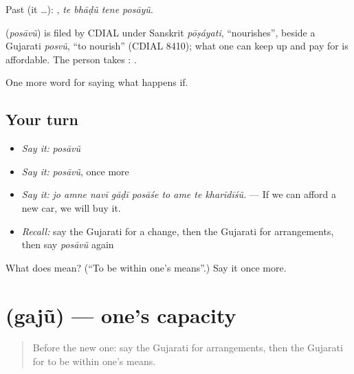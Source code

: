 Past (it …):    , \emph{te bhāḍũ tene posāyũ}.

\begin{cousinweb}
\textbf{} (\emph{posāvũ}) is filed by CDIAL under Sanskrit \emph{pōṣáyati}, \textquotedblleft{}nourishes\textquotedblright{}, beside a Gujarati \emph{posvũ}, \textquotedblleft{}to nourish\textquotedblright{} (CDIAL 8410); what one can keep up and pay for is affordable. The person takes \textbf{}: \textbf{  }.
\end{cousinweb}

\begin{grammarlens}[title={What you've built}]
One more word for saying what happens if.
\end{grammarlens}

\subsection*{Your turn}
\begin{itemize}
\raggedright
  \item \emph{Say it:} \emph{posāvũ}
  \item \emph{Say it:} \emph{posāvũ}, once more
  \item \emph{Say it:} \emph{jo amne navī gāḍī posāśe to ame te kharīdīśũ.} — If we can afford a new car, we will buy it.
  \item \emph{Recall:} say the Gujarati for a change, then the Gujarati for arrangements, then say \emph{posāvũ} again
\end{itemize}

\begin{tcolorbox}[breakable,colback=teal!4,colframe=teal!35!black,title={Before you move on}]
What does  mean? (\textquotedblleft{}To be within one's means\textquotedblright{}.) Say it once more.
\end{tcolorbox}
\section[\texorpdfstring{\gu{ગજું} (gajũ)}{ગજું (gajũ)}]{ (gajũ) — one's capacity}

\label{lesson:GU-C532-gaju}



\begin{quote}
Before the new one: say the Gujarati for arrangements, then the Gujarati for to be within one's means.
\end{quote}

